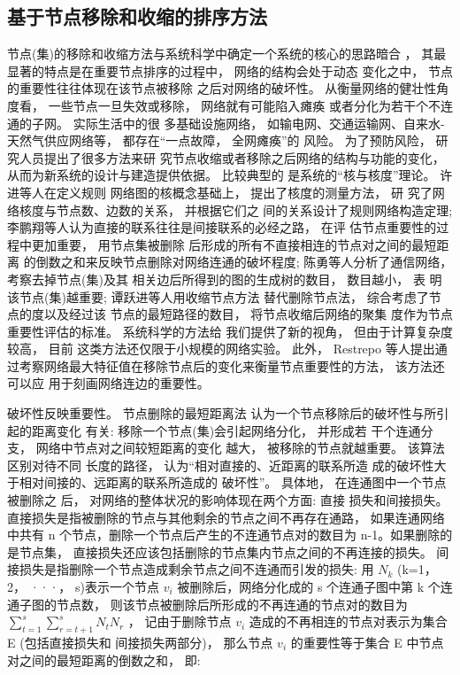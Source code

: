 	\subsection{基于节点移除和收缩的排序方法}
	节点(集)的移除和收缩方法与系统科学中确定一个系统的核心的思路暗合 ， 其最显著的特点是在重要节点排序的过程中， 网络的结构会处于动态 变化之中， 节点的重要性往往体现在该节点被移除 之后对网络的破坏性。 从衡量网络的健壮性角度看， 一些节点一旦失效或移除， 网络就有可能陷入瘫痪 或者分化为若干个不连通的子网。 实际生活中的很 多基础设施网络， 如输电网、交通运输网、自来水- 天然气供应网络等， 都存在“一点故障， 全网瘫痪”的 风险。 为了预防风险， 研究人员提出了很多方法来研 究节点收缩或者移除之后网络的结构与功能的变化， 从而为新系统的设计与建造提供依据。 比较典型的 是系统的“核与核度”理论。 许进等人在定义规则 网络图的核概念基础上， 提出了核度的测量方法， 研 究了网络核度与节点数、边数的关系， 并根据它们之 间的关系设计了规则网络构造定理; 李鹏翔等人认为直接的联系往往是间接联系的必经之路， 在评 估节点重要性的过程中更加重要， 用节点集被删除 后形成的所有不直接相连的节点对之间的最短距离 的倒数之和来反映节点删除对网络连通的破坏程度; 陈勇等人分析了通信网络， 考察去掉节点(集)及其 相关边后所得到的图的生成树的数目， 数目越小， 表 明该节点(集)越重要; 谭跃进等人用收缩节点方法 替代删除节点法， 综合考虑了节点的度以及经过该 节点的最短路径的数目， 将节点收缩后网络的聚集 度作为节点重要性评估的标准。 系统科学的方法给 我们提供了新的视角， 但由于计算复杂度较高， 目前 这类方法还仅限于小规模的网络实验。 此外， Restrepo 等人\parencite{Restrepo2006Characterizing}提出通过考察网络最大特征值在移除节点后的变化来衡量节点重要性的方法， 该方法还可以应 用于刻画网络连边的重要性。


	破坏性反映重要性。 节点删除的最短距离法\parencite{lpx2004wl} 认为一个节点移除后的破坏性与所引起的距离变化 有关: 移除一个节点(集)会引起网络分化， 并形成若 干个连通分支， 网络中节点对之间较短距离的变化 越大， 被移除的节点就越重要。 该算法区别对待不同 长度的路径， 认为“相对直接的、近距离的联系所造 成的破坏性大于相对间接的、远距离的联系所造成的 破坏性”\parencite{lpx2004wl}。 具体地， 在连通图中一个节点被删除之 后， 对网络的整体状况的影响体现在两个方面: 直接 损失和间接损失。
				直接损失是指被删除的节点与其他剩余的节点之间不再存在通路， 如果连通网络中共有 n 个节点，删除一个节点后产生的不连通节点对的数目为 n-1。如果删除的是节点集， 直接损失还应该包括删除的节点集内节点之间的不再连接的损失。 间接损失是指删除一个节点造成剩余节点之间不连通而引发的损失: 用 $N_k$ (k=1， 2， ···， s)表示一个节点 $v_i$ 被删除后，网络分化成的 s 个连通子图中第 k 个连通子图的节点数， 则该节点被删除后所形成的不再连通的节点对的数目为$\sum\limits_{t = 1}^s {\sum\limits_{r = t + 1}^s {{N_t}{N_r}} } $ ， 记由于删除节点 $v_i$ 造成的不再相连的节点对表示为集合 E (包括直接损失和 间接损失两部分)， 那么节点 $v_i$ 的重要性等于集合 E 中节点对之间的最短距离的倒数之和， 即:

